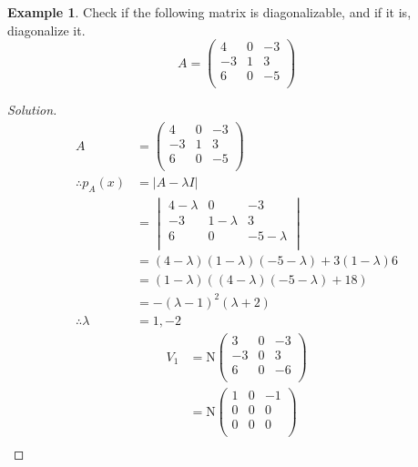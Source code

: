 \documentclass[fleqn, a4paper, 12pt]{article}
\newcommand{\N}{\mathrm{N}}
\theoremstyle{definition}
\newtheorem{example}{Example}
\theoremstyle{theorem}
\newenvironment{solution}
{\begin{proof}[Solution]\let\qed\relax}
	{\end{proof}}
\begin{document}
\begin{example}
	Check if the following matrix is diagonalizable, and if it is, diagonalize it.
	\begin{equation*}
		A =
			\begin{pmatrix}
				4 & 0 & -3\\
				-3 & 1 & 3\\
				6 & 0 & -5\\
			\end{pmatrix}
	\end{equation*}
\end{example}

\begin{solution}
	\begin{align*}
		A &=
		\begin{pmatrix}
			4 & 0 & -3\\
			-3 & 1 & 3\\
			6 & 0 & -5\\
		\end{pmatrix}\\
		\therefore p_A(x) &= |A - \lambda I|\\
		&= 
			\begin{vmatrix}
				4 - \lambda & 0 & -3\\
				-3 & 1 - \lambda & 3\\
				6 & 0 & -5 - \lambda\\
			\end{vmatrix}\\
		&= (4 - \lambda) (1 - \lambda) (-5 - \lambda) + 3 (1 - \lambda) 6\\
		&= (1 - \lambda) ((4 - \lambda)(-5 - \lambda) + 18)\\
		&= -(\lambda - 1)^2 (\lambda + 2)\\
		\therefore \lambda &= 1, -2
	\end{align*}
	\begin{align*}
		V_1 &= \N 
			\begin{pmatrix}
				3 & 0 & -3\\
				-3 & 0 & 3\\
				6 & 0 & -6\\
			\end{pmatrix}\\
		&= \N
			\begin{pmatrix}
				1 & 0 & -1\\
				0 & 0 & 0\\
				0 & 0 & 0\\
			\end{pmatrix}\\

\end{align*}
\end{solution}
\end{document}
